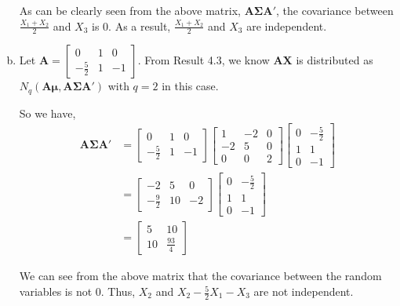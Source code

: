 \documentclass[12pt]{article}\usepackage[]{graphicx}\usepackage[]{color}
\newcommand{\vct}{\mathbf}
\begin{document}
\begin{enumerate}[a)]
As can be clearly seen from the above matrix, $\vct{A}\vct{\Sigma}\vct{A}'$, the covariance between $\frac{X_1 + X_2}{2}$ and $X_3$ is 0. As a result, $\frac{X_1 + X_2}{2}$ and $X_3$ are independent.

\item Let $\vct{A} = \begin{bmatrix} 0 & 1 & 0 \\ -\frac{5}{2} & 1 & -1\end{bmatrix}$. From Result 4.3, we know $\vct{A}\vct{X}$ is distributed as $N_q(\vct{A}\vct{\mu}, \vct{A}\vct{\Sigma}\vct{A}')$ with $q = 2$ in this case.

So we have,
\begin{align*}
\vct{A}\vct{\Sigma}\vct{A}' &= \begin{bmatrix} 0 & 1 & 0 \\ -\frac{5}{2} & 1 & -1\end{bmatrix} \begin{bmatrix} 1 & -2 & 0 \\ -2 & 5 & 0 \\ 0 & 0 & 2 \end{bmatrix} \begin{bmatrix} 0 & -\frac{5}{2} \\ 1 & 1 \\ 0 & -1\end{bmatrix}\\
&= \begin{bmatrix} -2 & 5 & 0 \\ -\frac{9}{2} & 10 & -2\end{bmatrix} \begin{bmatrix} 0 & -\frac{5}{2} \\ 1 & 1 \\ 0 & -1\end{bmatrix}\\
&= \begin{bmatrix} 5 & 10 \\ 10 & \frac{93}{4} \end{bmatrix}
\end{align*}

We can see from the above matrix that the covariance between the random variables is not 0. Thus, $X_2$ and $X_2 - \frac{5}{2}X_1 - X_3$ are not independent.
\end{enumerate}

\end{document}
